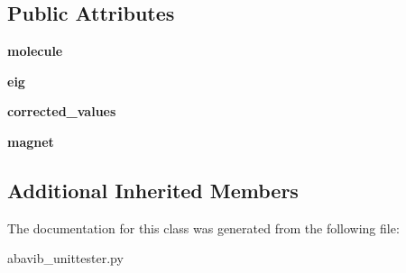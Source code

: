 \subsection*{Public Attributes}
\begin{DoxyCompactItemize}
\item 
\hypertarget{classabavib__unittester_1_1magnetizability__test_af5a150d0b494c0573ea280d2ee6dc533}{{\bfseries molecule}}\label{classabavib__unittester_1_1magnetizability__test_af5a150d0b494c0573ea280d2ee6dc533}

\item 
\hypertarget{classabavib__unittester_1_1magnetizability__test_abd3b2d980cce517777d8e5b15b994d9f}{{\bfseries eig}}\label{classabavib__unittester_1_1magnetizability__test_abd3b2d980cce517777d8e5b15b994d9f}

\item 
\hypertarget{classabavib__unittester_1_1magnetizability__test_af66fe08f778c2e7e02c1f0adb8da9636}{{\bfseries corrected\+\_\+values}}\label{classabavib__unittester_1_1magnetizability__test_af66fe08f778c2e7e02c1f0adb8da9636}

\item 
\hypertarget{classabavib__unittester_1_1magnetizability__test_a8b7916b50c9bbb7d6070b64a1f479c8a}{{\bfseries magnet}}\label{classabavib__unittester_1_1magnetizability__test_a8b7916b50c9bbb7d6070b64a1f479c8a}

\end{DoxyCompactItemize}
\subsection*{Additional Inherited Members}


The documentation for this class was generated from the following file\+:\begin{DoxyCompactItemize}
\item 
abavib\+\_\+unittester.\+py\end{DoxyCompactItemize}
